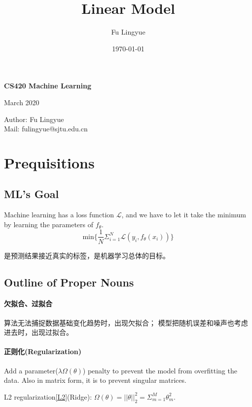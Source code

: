 
\title{Linear Model}
\author{Fu Lingyue}
\date{\today}


  \pagestyle{main}

\begin{center}
    \Huge
    \textbf{CS420 Machine Learning}
     
\end{center}

\begin{center}
    \par March 2020
    \par Author: Fu Lingyue  \\Mail: fulingyue@sjtu.edu.cn
\end{center}

\tableofcontents
\newpage

\section{Prequisitions}
\subsection{ML's Goal}
Machine learning has a loss function $\mathcal{L}$, 
and we have to let it take the minimum by learning the parameters of $f_\theta$.
$$ 
\mathrm{min} \{\frac{1}{N} \Sigma_{i = 1}^N \mathcal{L} (y_i,f_\theta(x_i))\}
$$

是预测结果接近真实的标签，是机器学习总体的目标。

\subsection{Outline of Proper Nouns}
\paragraph{欠拟合、过拟合}
算法无法捕捉数据基础变化趋势时，出现欠拟合；
模型把随机误差和噪声也考虑进去时，出现过拟合。

\paragraph{正则化(Regularization)} Add a parameter($\lambda \Omega(\theta)$) penalty to prevent the model from overfitting the data. Also in matrix form, it is to prevent singular matrices.

L2 regularization\ref{L2}(Ridge): $\Omega(\theta) = ||\theta||^2_2 = \Sigma_{m=1}^M\theta_m^2$.

